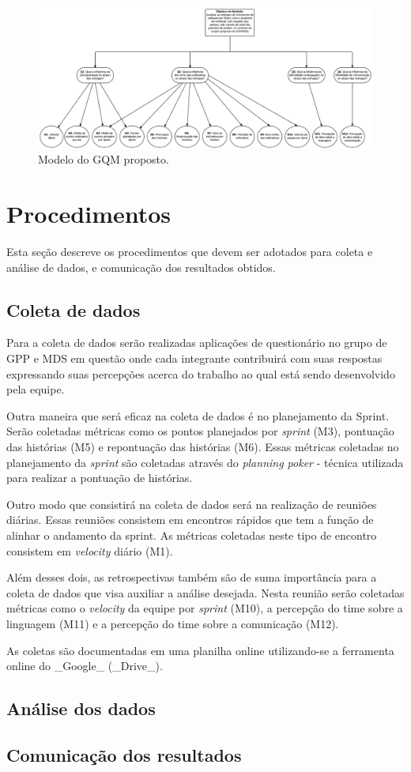 	\begin{figure}[!htb]
	  \centering
	  \includegraphics[scale=0.27, angle=90]{figuras/GQM}
	  \caption[Modelo do GQM proposto.]{Modelo do GQM proposto.}
	  \label{gqm_proposto}
	\end{figure}

    \section{Procedimentos}

      Esta seção descreve os procedimentos que devem ser adotados para coleta e análise de dados, e comunicação dos resultados obtidos.

      \subsection{Coleta de dados}

      Para a coleta de dados serão realizadas aplicações de questionário no grupo de GPP e MDS em questão onde cada integrante contribuirá com suas respostas expressando suas percepções acerca do trabalho ao qual está sendo desenvolvido pela equipe.

      Outra maneira que será eficaz na coleta de dados é no planejamento da Sprint. Serão coletadas métricas como os pontos planejados por \textit{sprint} (M3), pontuação das histórias (M5) e repontuação das histórias (M6). Essas métricas coletadas no planejamento da \textit{sprint} são coletadas através do \textit{planning poker} - técnica utilizada para realizar a pontuação de histórias.

      Outro modo que consistirá na coleta de dados será na realização de reuniões diárias. Essas reuniões consistem em encontros rápidos que tem a função de alinhar o andamento da sprint. As métricas coletadas neste tipo de encontro consistem em \textit{velocity} diário (M1).

      Além desses dois, as retrospectivas também são de suma importância para a coleta de dados que visa auxiliar a análise desejada. Nesta reunião serão coletadas métricas como o \textit{velocity} da equipe por \textit{sprint} (M10), a percepção do time sobre a linguagem (M11) e a percepção do time sobre a comunicação (M12).

      As coletas são documentadas em uma planilha online utilizando-se a ferramenta online do _Google_ (_Drive_).

      \subsection{Análise dos dados}

      \subsection{Comunicação dos resultados}